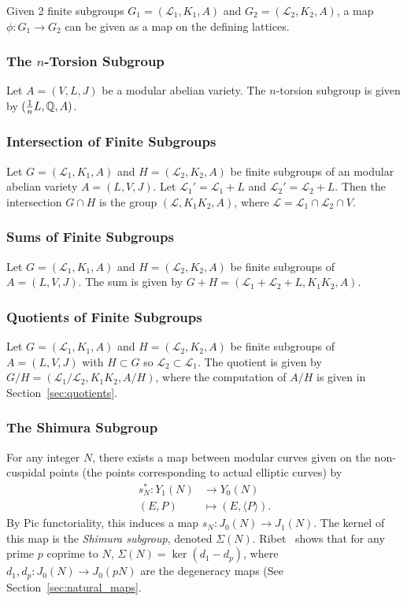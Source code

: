 \documentclass{article}
\begin{document}
Given 2 finite subgroups $G_1=(\mathcal{L}_1, K_1, A)$ and $G_2=(\mathcal{L}_2,
K_2, A)$, a map $\phi: G_1\to G_2$ can be given as a map on the defining
lattices.

\subsubsection{The $n$-Torsion Subgroup}

Let $A=(V, L, J)$ be a modular abelian variety. The $n$-torsion subgroup is
given by $(\frac{1}{n} L, \mathbb{Q}, A)$.

\subsubsection{Intersection of Finite Subgroups}
\label{sec:finitegroup_intersection}
Let $G=(\mathcal{L}_1, K_1, A)$ and $H=(\mathcal{L}_2, K_2, A)$ be finite
subgroups of an modular abelian variety $A=(L, V, J)$. Let $\mathcal{L}_1 ' =
\mathcal{L}_1+L$ and $\mathcal{L}_2 ' = \mathcal{L}_2 + L$. Then the
intersection $G\cap H$ is the group $(\mathcal{L}, K_1K_2, A)$, where
$\mathcal{L}=\mathcal{L}_1\cap \mathcal{L}_2 \cap V$.

\subsubsection{Sums of Finite Subgroups}

Let $G=(\mathcal{L}_1, K_1, A)$ and $H=(\mathcal{L}_2, K_2, A)$ be finite
subgroups of $A=(L, V, J)$. The sum is given by $G+H=(\mathcal{L}_1 +
\mathcal{L}_2+L, K_1K_2, A)$.

\subsubsection{Quotients of Finite Subgroups}

Let $G=(\mathcal{L}_1, K_1, A)$ and $H=(\mathcal{L}_2, K_2, A)$ be finite
subgroups of $A=(L, V, J)$ with $H\subset G$ so $\mathcal{L}_2\subset
\mathcal{L}_1$. The quotient is given by $G/H=(\mathcal{L}_1/\mathcal{L}_2,
K_1K_2, A/H)$, where the computation of $A/H$ is given in
Section~\ref{sec:quotients}.

\subsubsection{The Shimura Subgroup}

For any integer $N$, there exists a map between modular curves given
on the non-cuspidal points (the points corresponding to actual elliptic curves)
by
\begin{align*}
    s_N ^*: Y_1(N) & \to Y_0(N)                      \\
    (E, P)         & \mapsto (E, \langle P \rangle).
\end{align*}
By Pic functoriality, this induces a map $s_N: J_0(N)\to J_1(N)$. The kernel of
this map is the \emph{Shimura subgroup}, denoted $\Sigma(N)$.
Ribet~\cite[Theorem 4.3]{ribet:congruence_relations} shows that for any prime
$p$ coprime to $N$, $\Sigma(N)=\ker(d_1 - d_p)$, where $d_1,d_p :J_0(N)\to
J_0(pN)$ are the degeneracy maps (See Section~\ref{sec:natural_maps}.
\end{document}
